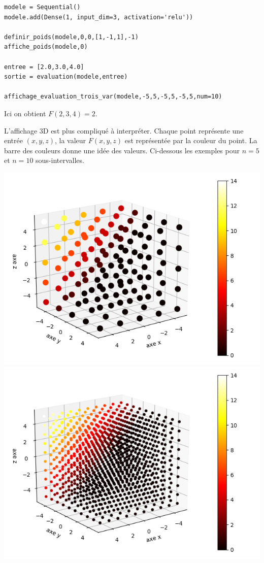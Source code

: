 \documentclass[11pt,class=report,crop=false]{standalone}
\begin{document}


\begin{lstlisting}
modele = Sequential()
modele.add(Dense(1, input_dim=3, activation='relu'))

definir_poids(modele,0,0,[1,-1,1],-1)
affiche_poids(modele,0)  

entree = [2.0,3.0,4.0]
sortie = evaluation(modele,entree)

affichage_evaluation_trois_var(modele,-5,5,-5,5,-5,5,num=10)
\end{lstlisting}

Ici on obtient $F(2,3,4) = 2$.

L'affichage 3D est plus compliqué à interpréter. Chaque point représente une entrée $(x,y,z)$, la valeur $F(x,y,z)$ est représentée par la couleur du point.
La barre des couleurs donne une idée des valeurs. Ci-dessous les exemples pour $n = 5$ et $n= 10$ sous-intervalles.

\begin{center}
\includegraphics[scale=\myscale,scale=0.5]{figures/pythontf-3var-01a}
\includegraphics[scale=\myscale,scale=0.5]{figures/pythontf-3var-01b}
\end{center}
\end{document}
